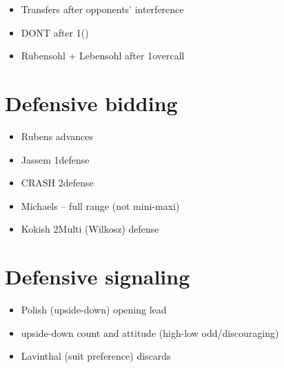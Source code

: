 \documentclass[12pt, a4paper]{report}
\begin{document}
{        \begin{itemize}
            \item Transfers after opponents' interference
            \item DONT after 1\nt (\dbl)
            \item Rubensohl + Lebensohl after 1\nt overcall
        \end{itemize}

    \section*{\colorbox{blue!30}{Defensive bidding}}

        \begin{itemize}
            \item Rubens advances
            \item Jassem 1\nt defense
            \item CRASH 2\nt defense
            \item Michaels -- full range (not mini-maxi)
            \item Kokish 2\diams Multi (Wilkosz) defense
        \end{itemize}

    \section*{\colorbox{blue!30}{Defensive signaling}}

        \begin{itemize}
            \item Polish (upside-down) opening lead
            \item upside-down count and attitude (high-low odd/discouraging)
            \item Lavinthal (suit preference) discards
        \end{itemize}

}
\end{document}
